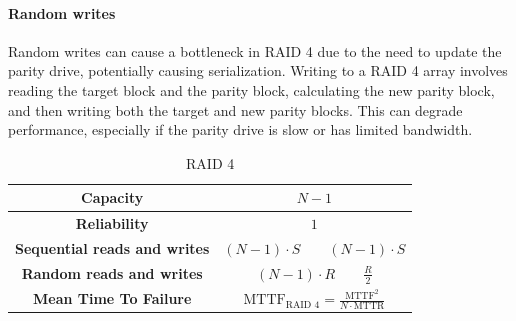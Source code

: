 \paragraph*{Random writes}
Random writes can cause a bottleneck in RAID 4 due to the need to update the parity drive, potentially causing serialization.
 Writing to a RAID 4 array involves reading the target block and the parity block, calculating the new parity block, and then writing both the target and new parity blocks. 
This can degrade performance, especially if the parity drive is slow or has limited bandwidth.
\begin{table}[H]
    \centering
    \begin{tabular}{|cc|}
    \hline
    \textbf{Capacity}                    & $N-1$                                                                  \\ \hline
    \textbf{Reliability}                 & $1$                                                                    \\ \hline
    \textbf{Sequential reads and writes} & $(N-1)\cdot S \qquad (N-1)\cdot S$                                     \\ \hline
    \textbf{Random reads and writes}     & $(N-1)\cdot R \qquad \frac{R}{2}$                                      \\ \hline
    \textbf{Mean Time To Failure}        & $\text{MTTF}_{\text{RAID }4}=\frac{\text{MTTF}^2}{N\cdot \text{MTTR}}$ \\ \hline
    \end{tabular}
    \caption{RAID 4}
\end{table}

